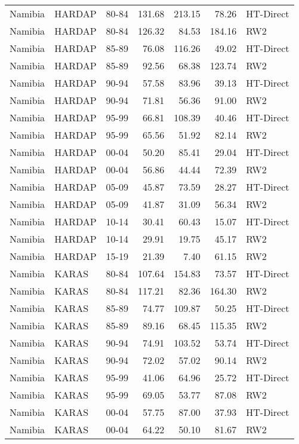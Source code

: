 \begin{longtable}{lllrrrl}
  Namibia & HARDAP & 80-84 & 131.68 & 213.15 & 78.26 & HT-Direct \\ 
  Namibia & HARDAP & 80-84 & 126.32 & 84.53 & 184.16 & RW2 \\ 
  Namibia & HARDAP & 85-89 & 76.08 & 116.26 & 49.02 & HT-Direct \\ 
  Namibia & HARDAP & 85-89 & 92.56 & 68.38 & 123.74 & RW2 \\ 
  Namibia & HARDAP & 90-94 & 57.58 & 83.96 & 39.13 & HT-Direct \\ 
  Namibia & HARDAP & 90-94 & 71.81 & 56.36 & 91.00 & RW2 \\ 
  Namibia & HARDAP & 95-99 & 66.81 & 108.39 & 40.46 & HT-Direct \\ 
  Namibia & HARDAP & 95-99 & 65.56 & 51.92 & 82.14 & RW2 \\ 
  Namibia & HARDAP & 00-04 & 50.20 & 85.41 & 29.04 & HT-Direct \\ 
  Namibia & HARDAP & 00-04 & 56.86 & 44.44 & 72.39 & RW2 \\ 
  Namibia & HARDAP & 05-09 & 45.87 & 73.59 & 28.27 & HT-Direct \\ 
  Namibia & HARDAP & 05-09 & 41.87 & 31.09 & 56.34 & RW2 \\ 
  Namibia & HARDAP & 10-14 & 30.41 & 60.43 & 15.07 & HT-Direct \\ 
  Namibia & HARDAP & 10-14 & 29.91 & 19.75 & 45.17 & RW2 \\ 
  Namibia & HARDAP & 15-19 & 21.39 & 7.40 & 61.15 & RW2 \\ 
  Namibia & KARAS & 80-84 & 107.64 & 154.83 & 73.57 & HT-Direct \\ 
  Namibia & KARAS & 80-84 & 117.21 & 82.36 & 164.30 & RW2 \\ 
  Namibia & KARAS & 85-89 & 74.77 & 109.87 & 50.25 & HT-Direct \\ 
  Namibia & KARAS & 85-89 & 89.16 & 68.45 & 115.35 & RW2 \\ 
  Namibia & KARAS & 90-94 & 74.91 & 103.52 & 53.74 & HT-Direct \\ 
  Namibia & KARAS & 90-94 & 72.02 & 57.02 & 90.14 & RW2 \\ 
  Namibia & KARAS & 95-99 & 41.06 & 64.96 & 25.72 & HT-Direct \\ 
  Namibia & KARAS & 95-99 & 69.05 & 53.77 & 87.08 & RW2 \\ 
  Namibia & KARAS & 00-04 & 57.75 & 87.00 & 37.93 & HT-Direct \\ 
  Namibia & KARAS & 00-04 & 64.22 & 50.10 & 81.67 & RW2 \\ 

\end{longtable}
